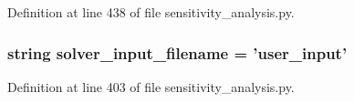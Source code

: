Definition at line 438 of file sensitivity\-\_\-analysis.\-py.

\hypertarget{namespacesensitivity__analysis_a92a75cd7aa57960ca65957a1baa06d77}{
\subsubsection[{solver\-\_\-input\-\_\-filename}]{\setlength{\rightskip}{0pt plus 5cm}string solver\-\_\-input\-\_\-filename = 'user\-\_\-input'}}\label{namespacesensitivity__analysis_a92a75cd7aa57960ca65957a1baa06d77}


Definition at line 403 of file sensitivity\-\_\-analysis.\-py.

